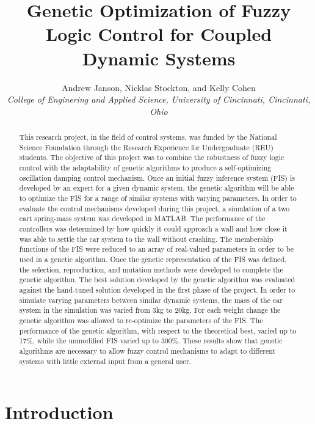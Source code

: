 \documentclass[draft]{aiaa-tc}%
\title{Genetic Optimization of Fuzzy Logic Control for Coupled Dynamic Systems}
\author{
  Andrew Janson, %
  Nicklas Stockton, %
  and Kelly Cohen\\
  {\normalsize\itshape
   College of Enginering and Applied Science, University of Cincinnati, Cincinnati, Ohio}}
\begin{document}
\maketitle

\begin{abstract}
This research project, in the field of control systems, was funded by the National Science Foundation through the Research Experience for Undergraduate (REU) students. The objective of this project was to combine the robustness of fuzzy logic control with the adaptability of genetic algorithms to produce a self-optimizing oscillation damping control mechanism. Once an initial fuzzy inference system (FIS) is developed by an expert for a given dynamic system, the genetic algorithm will be able to optimize the FIS for a range of similar systems with varying parameters. In order to evaluate the control mechanisms developed during this project, a simulation of a two cart spring-mass system was developed in MATLAB. The performance of the controllers was determined by how quickly it could approach a wall and how close it was able to settle the car system to the wall without crashing. The membership functions of the FIS were reduced to an array of real-valued parameters in order to be used in a genetic algorithm. Once the genetic representation of the FIS was defined, the selection, reproduction, and mutation methods were developed to complete the genetic algorithm. The best solution developed by the genetic algorithm was evaluated against the hand-tuned solution developed in the first phase of the project. In order to simulate varying parameters between similar dynamic systems, the mass of the car system in the simulation was varied from 3kg to 20kg. For each weight change the genetic algorithm was allowed to re-optimize the parameters of the FIS. The performance of the genetic algorithm, with respect to the theoretical best, varied up to 17\%, while the unmodified FIS varied up to 300\%. These results show that genetic algorithms are necessary to allow fuzzy control mechanisms to adapt to different systems with little external input from a general user.
\end{abstract}

\printnomenclature
\section{Introduction}\label{sec:intro}
\end{document}
